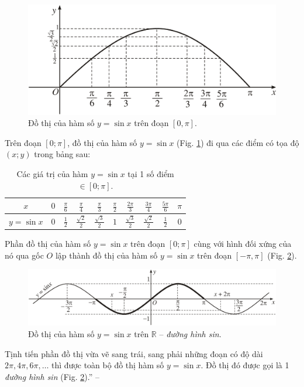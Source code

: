 \documentclass[oneside]{book}
\numberwithin{equation}{section}
\begin{document}
\begin{itemize}
	\begin{figure}[H]
		\centering
		\includegraphics[scale=0.2]{graph_sin}
		\caption{Đồ thị của hàm số $y = \sin x$ trên đoạn $[0,\pi]$.}
		\label{fig:graph of sin}
	\end{figure}
	Trên đoạn $[0;\pi]$, đồ thị của hàm số $y = \sin x$ (Fig. \ref{fig:graph of sin}) đi qua các điểm có tọa độ $(x;y)$ trong bảng sau:
	\begin{table}[H]
		\centering
		\begin{tabular}{|c|c|c|c|c|c|c|c|c|c|}
			\hline
			$x$ & $0$ & $\frac{\pi}{6}$ & $\frac{\pi}{4}$ & $\frac{\pi}{3}$ & $\frac{\pi}{2}$ & $\frac{2\pi}{3}$ & $\frac{3\pi}{4}$ & $\frac{5\pi}{6}$ & $\pi$ \\
			\hline
			$y = \sin x$ & $0$ & $\frac{1}{2}$ & $\frac{\sqrt{2}}{2}$ & $\frac{\sqrt{3}}{2}$ & $1$ & $\frac{\sqrt{3}}{2}$ & $\frac{\sqrt{2}}{2}$ & $\frac{1}{2}$ & $0$ \\
			\hline
		\end{tabular}
		\caption{Các giá trị của hàm $y = \sin x$ tại 1 số điểm $\in[0;\pi]$.}
	\end{table}
	Phần đồ thị của hàm số $y = \sin x$ trên đoạn $[0;\pi]$ cùng với hình đối xứng của nó qua gốc $O$ lập thành đồ thị của hàm số $y = \sin x$ trên đoạn $[-\pi,\pi]$ (Fig. \ref{fig:duong hinh sin}).
	
	\begin{figure}[H]
		\centering
		\includegraphics[scale=0.2]{duong_hinh_sin}
		\caption{Đồ thị của hàm số $y = \sin x$ trên $\mathbb{R}$ -- \textit{đường hình sin}.}
		\label{fig:duong hinh sin}
	\end{figure}
	Tịnh tiến phần đồ thị vừa vẽ sang trái, sang phải những đoạn có độ dài $2\pi,4\pi,6\pi,\ldots$ thì được toàn bộ đồ thị hàm số $y = \sin x$. Đồ thị đó được gọi là 1 \textit{đường hình sin} (Fig. \ref{fig:duong hinh sin}).'' -- \cite[pp. 6--7]{SGK_Toan_11_dai_so_giai_tich_nang_cao}
\end{itemize}
\end{document}
